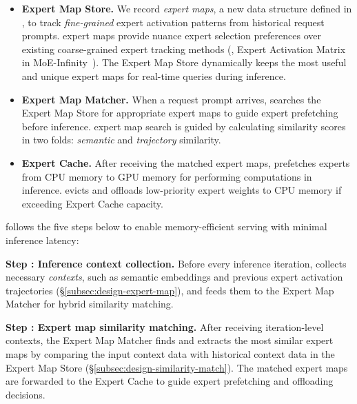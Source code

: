 \begin{itemize}[noitemsep,topsep=0pt,parsep=0pt,partopsep=0pt]
    \item \textbf{Expert Map Store.} 
    We record \textit{expert maps}, a new data structure defined in \sys, to track \textit{fine-grained} expert activation patterns from historical request prompts. 
    expert maps provide nuance expert selection preferences over existing coarse-grained expert tracking methods (\eg, Expert Activation Matrix in MoE-Infinity~\cite{xue2024moe}).
    The Expert Map Store dynamically keeps the most useful and unique expert maps for real-time queries during inference.
    \item \textbf{Expert Map Matcher.} 
    When a request prompt arrives, \sys searches the Expert Map Store for appropriate expert maps to guide expert prefetching before inference. 
    expert map search is guided by calculating similarity scores in two folds: \textit{semantic} and \textit{trajectory} similarity.
    \item \textbf{Expert Cache.} 
    After receiving the matched expert maps, \sys prefetches experts from CPU memory to GPU memory for performing computations in inference. 
    \sys evicts and offloads low-priority expert weights to CPU memory if exceeding Expert Cache capacity.
\end{itemize}



\sys follows the five steps below to enable memory-efficient \MoE serving with minimal inference latency:

\noindent \textbf{Step {\Large {}}: Inference context collection.} 
Before every inference iteration, \sys collects necessary \textit{contexts}, such as semantic embeddings and previous expert activation trajectories (\S\ref{subsec:design-expert-map}), and feeds them to the Expert Map Matcher for hybrid similarity matching.

\noindent \textbf{Step {\Large {}}: Expert map similarity matching.} 
After receiving iteration-level contexts, the Expert Map Matcher finds and extracts the most similar expert maps by comparing the input context data with historical context data in the Expert Map Store (\S\ref{subsec:design-similarity-match}). 
% 
The matched expert maps are forwarded to the Expert Cache to guide expert prefetching and offloading decisions.

